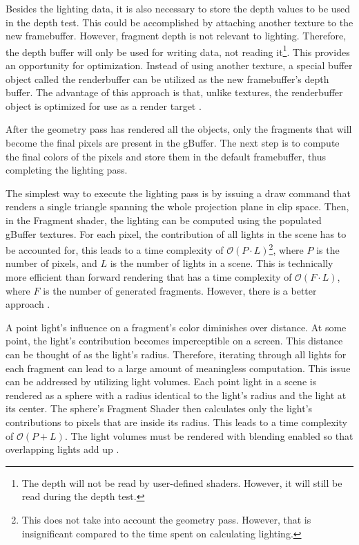\documentclass[
  digital,     %
  oneside,     %
  nosansbold,  %
  nocolorbold, %
  lof,         %
  lot,         %
]{fithesis4}
\begin{document}
Besides the lighting data, it is also necessary
to store the depth values to be used in the depth test. This could be accomplished by attaching another texture
to the new framebuffer. However, fragment depth is not relevant to lighting.
Therefore, the depth buffer will only be used for writing data, not reading it\footnote{The depth will not be read by user-defined shaders.
However, it will still be read during the depth test.}. This provides an opportunity for optimization.
Instead of using another texture, a special buffer object called the renderbuffer can be utilized as the new
framebuffer's depth buffer. The advantage of this approach is that, unlike textures, the renderbuffer object is optimized for
use as a render target \cite[p.526-540]{opengl-book} \cite{openglwiki-rbo}.

After the geometry pass has rendered all the objects, only the fragments that will become
the final pixels are present in the gBuffer. The next step is to compute the final colors of the pixels
and store them in the default framebuffer, thus completing the lighting pass.

The simplest way to execute the lighting pass is by issuing a draw command that renders a single triangle
spanning the whole projection plane in clip space. Then, in the Fragment shader, the lighting can be computed
using the populated gBuffer textures. For each pixel, the contribution
of all lights in the scene has to be accounted for, this leads to a time complexity of $\mathcal{O}(P\cdot L)$\footnote{This
does not take into account the geometry pass. However, that is insignificant compared to the time spent on calculating lighting.},
where $P$ is the number of pixels, and $L$ is the number of lights in a scene. This is technically
more efficient than forward rendering that has a time complexity of $\mathcal{O}(F\cdot L)$, where $F$
is the number of generated fragments. However, there is a better approach \cite{learnopengl-deferred}.

A point light's influence on a fragment's color diminishes over distance. At some point, the light's
contribution becomes imperceptible on a screen. This distance can be thought of as the light's radius.
Therefore, iterating through all lights for each fragment can lead to a large amount of meaningless computation.
This issue can be addressed by utilizing light volumes. Each point light in a scene is rendered as a sphere
with a radius identical to the light's radius and the light at its center. The sphere's Fragment Shader
then calculates only the light's contributions to pixels that are inside its radius. This leads
to a time complexity of $\mathcal{O}(P + L)$. The light
volumes must be rendered with blending enabled so that overlapping lights add up \cite{learnopengl-deferred}.
\end{document}
